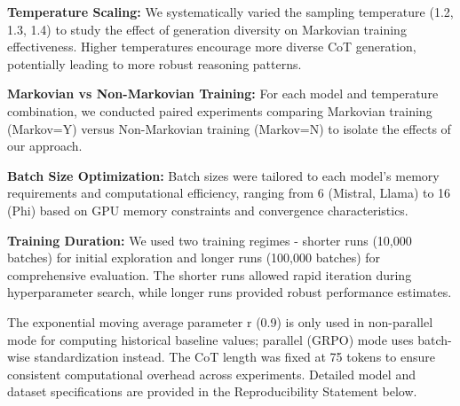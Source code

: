\documentclass{article} %
\begin{document}
\textbf{Temperature Scaling:} We systematically varied the sampling temperature (1.2, 1.3, 1.4) to study the effect of generation diversity on Markovian training effectiveness. Higher temperatures encourage more diverse CoT generation, potentially leading to more robust reasoning patterns.

\textbf{Markovian vs Non-Markovian Training:} For each model and temperature combination, we conducted paired experiments comparing Markovian training (Markov=Y) versus Non-Markovian training (Markov=N) to isolate the effects of our approach.

\textbf{Batch Size Optimization:} Batch sizes were tailored to each model's memory requirements and computational efficiency, ranging from 6 (Mistral, Llama) to 16 (Phi) based on GPU memory constraints and convergence characteristics.

\textbf{Training Duration:} We used two training regimes - shorter runs (10,000 batches) for initial exploration and longer runs (100,000 batches) for comprehensive evaluation. The shorter runs allowed rapid iteration during hyperparameter search, while longer runs provided robust performance estimates.

The exponential moving average parameter r (0.9) is only used in non-parallel mode for computing historical baseline values; parallel (GRPO) mode uses batch-wise standardization instead. The CoT length was fixed at 75 tokens to ensure consistent computational overhead across experiments. Detailed model and dataset specifications are provided in the Reproducibility Statement below.
\end{document}
